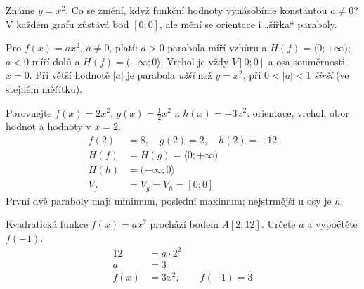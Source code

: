 \documentclass[11pt,a4paper]{article}
\begin{document}
Známe $y=x^2$. Co se změní, když funkční hodnoty vynásobíme konstantou $a\ne0$? V každém grafu zůstává bod $[0;0]$, ale mění se orientace i „šířka“ paraboly.
\begin{definiceBox}[title={Věta - Vliv koeficientu a na parabolu}]
Pro $f(x)=ax^2$, $a\ne0$, platí: $a>0$ parabola míří vzhůru a $H(f)=\langle0;+\infty)$;
$a<0$ míří dolů a $H(f)=(-\infty;0\rangle$. Vrchol je vždy $V[0;0]$ a osa souměrnosti $x=0$.
Při větší hodnotě $|a|$ je parabola \emph{užší} než $y=x^2$, při $0<|a|<1$ \emph{širší} (ve stejném měřítku).
\end{definiceBox}
\begin{center}
\end{center}

\begin{prikladReseniBox}[title={Příklad 1}]
Porovnejte $f(x)=2x^2$, $g(x)=\tfrac12 x^2$ a $h(x)=-3x^2$: orientace, vrchol, obor hodnot a hodnoty v $x=2$.
\tcblower
\[
\begin{aligned}
f(2)&=8,\quad g(2)=2,\quad h(2)=-12 \\
H(f)&=H(g)=\langle0;+\infty) \\
H(h)&=(-\infty;0\rangle \\
V_f&=V_g=V_h=[0;0]
\end{aligned}
\]
První dvě paraboly mají minimum, poslední maximum; nejstrmější u osy je $h$.
\end{prikladReseniBox}
\begin{prikladReseniBox}[title={Příklad 2}]
Kvadratická funkce $f(x)=ax^2$ prochází bodem $A[2;12]$. Určete $a$ a vypočtěte $f(-1)$.
\tcblower
\[
\begin{aligned}
12&=a\cdot2^2 \\
a&=3 \\
f(x)&=3x^2,\qquad f(-1)=3
\end{aligned}
\]

\end{prikladReseniBox}
\end{document}
